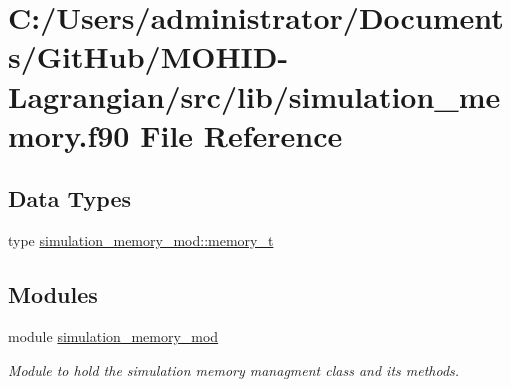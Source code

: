 \hypertarget{simulation__memory_8f90}{}\section{C\+:/\+Users/administrator/\+Documents/\+Git\+Hub/\+M\+O\+H\+I\+D-\/\+Lagrangian/src/lib/simulation\+\_\+memory.f90 File Reference}
\label{simulation__memory_8f90}
\subsection*{Data Types}
\begin{DoxyCompactItemize}
\item 
type \mbox{\hyperlink{structsimulation__memory__mod_1_1memory__t}{simulation\+\_\+memory\+\_\+mod\+::memory\+\_\+t}}
\end{DoxyCompactItemize}
\subsection*{Modules}
\begin{DoxyCompactItemize}
\item 
module \mbox{\hyperlink{namespacesimulation__memory__mod}{simulation\+\_\+memory\+\_\+mod}}
\begin{DoxyCompactList}\small\item\em Module to hold the simulation memory managment class and its methods. \end{DoxyCompactList}\end{DoxyCompactItemize}
